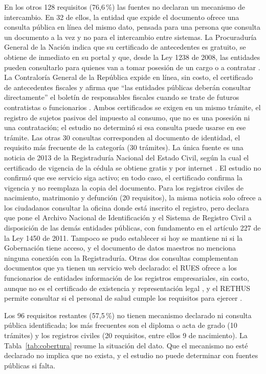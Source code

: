 En los otros 128 requisitos (76,6\,\%) las fuentes no declaran un mecanismo de intercambio. En 32 de ellos, la entidad que expide el documento ofrece una consulta pública en línea del mismo dato, pensada para una persona que consulta un documento a la vez y no para el intercambio entre sistemas. La Procuraduría General de la Nación indica que su certificado de antecedentes es gratuito, se obtiene de inmediato en su portal y que, desde la Ley 1238 de 2008, las entidades pueden consultarlo para quienes van a tomar posesión de un cargo o a contratar \parencite{procuraduria2026antecedentes}. La Contraloría General de la República expide en línea, sin costo, el certificado de antecedentes fiscales y afirma que \enquote{las entidades públicas deberán consultar directamente} el boletín de responsables fiscales cuando se trate de futuros contratistas o funcionarios \parencite{contraloria2026antecedentes}. Ambos certificados se exigen en un mismo trámite, el registro de sujetos pasivos del impuesto al consumo, que no es una posesión ni una contratación; el estudio no determinó si esa consulta puede usarse en ese trámite. Las otras 30 consultas corresponden al documento de identidad, el requisito más frecuente de la categoría (30 trámites). La única fuente es una noticia de 2013 de la Registraduría Nacional del Estado Civil, según la cual el certificado de vigencia de la cédula se obtiene gratis y por internet \parencite{registraduria2013vigencia}. El estudio no confirmó que ese servicio siga activo; en todo caso, el certificado confirma la vigencia y no reemplaza la copia del documento. Para los registros civiles de nacimiento, matrimonio y defunción (20 requisitos), la misma noticia solo ofrece a los ciudadanos consultar la oficina donde está inscrito el registro, pero declara que pone el Archivo Nacional de Identificación y el Sistema de Registro Civil a disposición de las demás entidades públicas, con fundamento en el artículo 227 de la Ley 1450 de 2011. Tampoco se pudo establecer si hoy se mantiene ni si la Gobernación tiene acceso, y el documento de datos maestros no menciona ninguna conexión con la Registraduría. Otras dos consultas complementan documentos que ya tienen un servicio web declarado: el RUES ofrece a los funcionarios de entidades información de los registros empresariales, sin costo, aunque no es el certificado de existencia y representación legal \parencite{rues2026consulta}, y el RETHUS permite consultar si el personal de salud cumple los requisitos para ejercer \parencite{minsalud2026rethus}.

Los 96 requisitos restantes (57,5\,\%) no tienen mecanismo declarado ni consulta pública identificada; los más frecuentes son el diploma o acta de grado (10 trámites) y los registros civiles (20 requisitos, entre ellos 9 de nacimiento). La Tabla~\ref{tab:cobertura} resume la situación del dato. Que el mecanismo no esté declarado no implica que no exista, y el estudio no puede determinar con fuentes públicas si falta.


